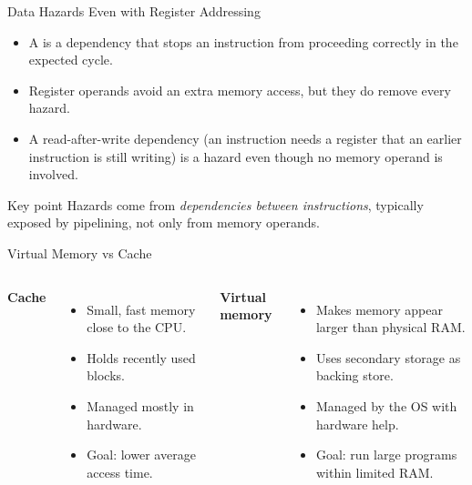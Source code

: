 \documentclass[aspectratio=169]{beamer}
\begin{document}
\begin{frame}{Data Hazards Even with Register Addressing}
  \begin{itemize}
    \item A  is a dependency that stops an instruction from
      proceeding correctly in the expected cycle.
    \item Register operands avoid an extra memory access, but they do
       remove every hazard.
    \item A read-after-write dependency (an instruction needs a register that
      an earlier instruction is still writing) is a hazard even though no
      memory operand is involved.
  \end{itemize}
  \begin{block}{Key point}
    Hazards come from \emph{dependencies between instructions}, typically
    exposed by pipelining, not only from memory operands.
  \end{block}
\end{frame}

\begin{frame}{Virtual Memory vs Cache}
  \begin{columns}[T]
      \textbf{Cache}
      \begin{itemize}
        \item Small, fast memory close to the CPU.
        \item Holds recently used blocks.
        \item Managed mostly in hardware.
        \item Goal: lower average access time.
      \end{itemize}
      \textbf{Virtual memory}
      \begin{itemize}
        \item Makes memory appear larger than physical RAM.
        \item Uses secondary storage as backing store.
        \item Managed by the OS with hardware help.
        \item Goal: run large programs within limited RAM.
      \end{itemize}
  \end{columns}
  \vspace{0.2cm}
\end{frame}
\end{document}

